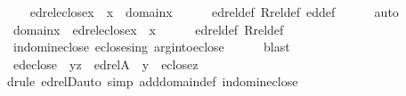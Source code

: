 \begin{isabellebody}
%
\isadelimproof
%
\endisadelimproof
%
\isatagproof
{}\isamarkupfalse%
\isanewline
\ \ \isamarkupfalse%
\ {\isachardoublequoteopen}edrel{\isacharparenleft}{\kern0pt}eclose{\isacharparenleft}{\kern0pt}{\isacharbraceleft}{\kern0pt}x{\isacharbraceright}{\kern0pt}{\isacharparenright}{\kern0pt}{\isacharparenright}{\kern0pt}\ {\isacharminus}{\kern0pt}{\isacharbackquote}{\kern0pt}{\isacharbackquote}{\kern0pt}\ {\isacharbraceleft}{\kern0pt}x{\isacharbraceright}{\kern0pt}\ {\isasymsubseteq}\ domain{\isacharparenleft}{\kern0pt}x{\isacharparenright}{\kern0pt}{\isachardoublequoteclose}\isanewline
\ \ \ \ \isamarkupfalse%
\ edrel{\isacharunderscore}{\kern0pt}def\ Rrel{\isacharunderscore}{\kern0pt}def\ ed{\isacharunderscore}{\kern0pt}def\isanewline
\ \ \ \ \isamarkupfalse%
\ auto\isanewline
{}\isamarkupfalse%
\isanewline
\ \ \isamarkupfalse%
\ {\isachardoublequoteopen}domain{\isacharparenleft}{\kern0pt}x{\isacharparenright}{\kern0pt}\ {\isasymsubseteq}\ edrel{\isacharparenleft}{\kern0pt}eclose{\isacharparenleft}{\kern0pt}{\isacharbraceleft}{\kern0pt}x{\isacharbraceright}{\kern0pt}{\isacharparenright}{\kern0pt}{\isacharparenright}{\kern0pt}\ {\isacharminus}{\kern0pt}{\isacharbackquote}{\kern0pt}{\isacharbackquote}{\kern0pt}\ {\isacharbraceleft}{\kern0pt}x{\isacharbraceright}{\kern0pt}{\isachardoublequoteclose}\isanewline
\ \ \ \ \isamarkupfalse%
\ edrel{\isacharunderscore}{\kern0pt}def\ Rrel{\isacharunderscore}{\kern0pt}def\isanewline
\ \ \ \ \isamarkupfalse%
\ in{\isacharunderscore}{\kern0pt}dom{\isacharunderscore}{\kern0pt}in{\isacharunderscore}{\kern0pt}eclose\ eclose{\isacharunderscore}{\kern0pt}sing\ arg{\isacharunderscore}{\kern0pt}into{\isacharunderscore}{\kern0pt}eclose\isanewline
\ \ \ \ \isamarkupfalse%
\ blast\isanewline
{}\isamarkupfalse%
%
\endisatagproof
{\isafoldproof}%
%
\isadelimproof
\isanewline
%
\endisadelimproof
\isanewline
{}\isamarkupfalse%
\ ed{\isacharunderscore}{\kern0pt}eclose\ {\isacharcolon}{\kern0pt}\ {\isachardoublequoteopen}{\isasymlangle}y{\isacharcomma}{\kern0pt}z{\isasymrangle}\ {\isasymin}\ edrel{\isacharparenleft}{\kern0pt}A{\isacharparenright}{\kern0pt}\ {\isasymLongrightarrow}\ y\ {\isasymin}\ eclose{\isacharparenleft}{\kern0pt}z{\isacharparenright}{\kern0pt}{\isachardoublequoteclose}\isanewline
%
\isadelimproof
\ \ %
\endisadelimproof
%
\isatagproof
{}\isamarkupfalse%
{\isacharparenleft}{\kern0pt}drule\ edrelD{\isacharcomma}{\kern0pt}auto\ simp\ add{\isacharcolon}{\kern0pt}domain{\isacharunderscore}{\kern0pt}def\ in{\isacharunderscore}{\kern0pt}dom{\isacharunderscore}{\kern0pt}in{\isacharunderscore}{\kern0pt}eclose{\isacharparenright}{\kern0pt}%

\end{isabellebody}
